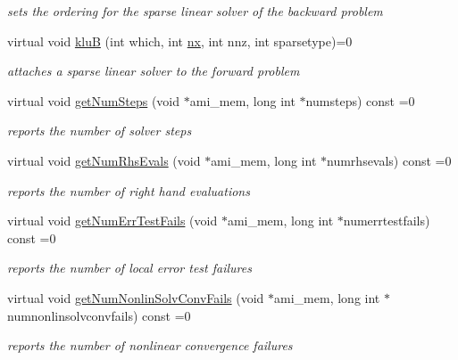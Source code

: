 \begin{DoxyCompactItemize}
\begin{DoxyCompactList}\small\item\em sets the ordering for the sparse linear solver of the backward problem \end{DoxyCompactList}\item 
virtual void \mbox{\hyperlink{classamici_1_1_solver_a5f9c6152e6e01f631cd5b68fd638281c}{kluB}} (int which, int \mbox{\hyperlink{classamici_1_1_solver_a86a18c4e461de76881b6af72e4feb8d9}{nx}}, int nnz, int sparsetype)=0
\begin{DoxyCompactList}\small\item\em attaches a sparse linear solver to the forward problem \end{DoxyCompactList}\item 
virtual void \mbox{\hyperlink{classamici_1_1_solver_ac72a1a31217465d0f016b38382e487fa}{get\+Num\+Steps}} (void $\ast$ami\+\_\+mem, long int $\ast$numsteps) const =0
\begin{DoxyCompactList}\small\item\em reports the number of solver steps \end{DoxyCompactList}\item 
virtual void \mbox{\hyperlink{classamici_1_1_solver_aaf8d4b1375cfa9e517ef0ec54e33d4d8}{get\+Num\+Rhs\+Evals}} (void $\ast$ami\+\_\+mem, long int $\ast$numrhsevals) const =0
\begin{DoxyCompactList}\small\item\em reports the number of right hand evaluations \end{DoxyCompactList}\item 
virtual void \mbox{\hyperlink{classamici_1_1_solver_a605fc85e2d8183dca4ebe24f9d810516}{get\+Num\+Err\+Test\+Fails}} (void $\ast$ami\+\_\+mem, long int $\ast$numerrtestfails) const =0
\begin{DoxyCompactList}\small\item\em reports the number of local error test failures \end{DoxyCompactList}\item 
virtual void \mbox{\hyperlink{classamici_1_1_solver_a34f79927b47e70db74f77943936e18b0}{get\+Num\+Nonlin\+Solv\+Conv\+Fails}} (void $\ast$ami\+\_\+mem, long int $\ast$numnonlinsolvconvfails) const =0
\begin{DoxyCompactList}\small\item\em reports the number of nonlinear convergence failures \end{DoxyCompactList}\item 

\end{DoxyCompactItemize}
